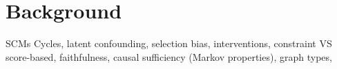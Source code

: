 \section*{Background}
SCMs
Cycles, latent confounding, selection bias, interventions, constraint VS score-based, faithfulness, causal sufficiency (Markov properties), graph types, 